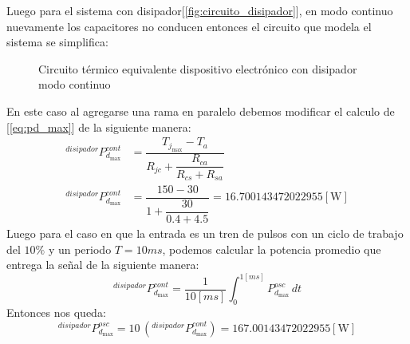 Luego para el sistema con disipador[\ref{fig:circuito_disipador}], en modo continuo nuevamente los capacitores no conducen entonces el circuito que modela el sistema se simplifica:
\begin{figure}[H]
\centering
{}
\caption{Circuito térmico equivalente dispositivo electrónico con disipador modo continuo}\label{fig:circuito_disipador_sin_capacitores}
\end{figure}
En este caso al agregarse una rama en paralelo debemos modificar el calculo de [\ref{eq:pd_max}] de la siguiente manera:
\begin{align}
   ^{disipador}P_{d_{\max}}^{cont}&=\dfrac{T_{j_{\max}}-T_a}{R_{jc}+\dfrac{R_{ca}}{R_{cs}+R_{sa}}}\\[10pt]
   ^{disipador}P_{d_{\max}}^{cont}&=\dfrac{150 - 30}{1 + \dfrac{30}{0.4 + 4.5}}=16.700143472022955 [\si{\watt}]\label{eq:pd_max_disipador}
\end{align}
Luego para el caso en que la entrada es un tren de pulsos con un ciclo de trabajo del $10\%$ y un periodo $T=10ms$, podemos calcular la potencia promedio
que entrega la señal de la siguiente manera:
\begin{equation}
   ^{disipador}P_{d_{\max}}^{cont}=\frac{1}{10[\si{ms}]}\int_0^{1[\si{ms}]}P_{d_{\max}}^{osc}\,dt
\end{equation}
Entonces nos queda:
\begin{equation}
   ^{disipador}P_{d_{\max}}^{osc}=10\,(^{disipador}P_{d_{\max}}^{cont})=167.00143472022955[\si{\watt}]
\end{equation}


